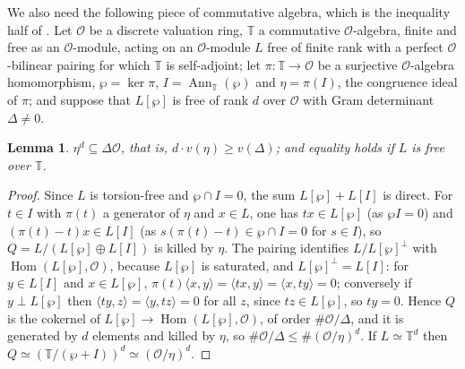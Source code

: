 \documentclass[11pt]{amsart}
\newtheorem{lemma}[theorem]{Lemma}
\theoremstyle{definition}
\newcommand{\T}{\mathbb{T}}
\begin{document}
We also need the following piece of commutative algebra, which is the inequality half of \cite[Lemma 4.17]{DDT}. Let $\mathcal{O}$ be a discrete valuation ring, $\T$ a commutative $\mathcal{O}$-algebra, finite and free as an $\mathcal{O}$-module, acting on an $\mathcal{O}$-module $L$ free of finite rank with a perfect $\mathcal{O}$-bilinear pairing for which $\T$ is self-adjoint; let $\pi\colon\T\to\mathcal{O}$ be a surjective $\mathcal{O}$-algebra homomorphism, $\wp=\ker\pi$, $I=\operatorname{Ann}_\T(\wp)$ and $\eta=\pi(I)$, the congruence ideal of $\pi$; and suppose that $L[\wp]$ is free of rank $d$ over $\mathcal{O}$ with Gram determinant $\Delta\ne0$.

\begin{lemma}\label{lem:ddt417}
$\eta^d\subseteq\Delta\mathcal{O}$, that is, $d\cdot v(\eta)\ge v(\Delta)$; and equality holds if $L$ is free over $\T$.
\end{lemma}
\begin{proof}
Since $L$ is torsion-free and $\wp\cap I=0$, the sum $L[\wp]+L[I]$ is direct. For $t\in I$ with $\pi(t)$ a generator of $\eta$ and $x\in L$, one has $tx\in L[\wp]$ (as $\wp I=0$) and $(\pi(t)-t)x\in L[I]$ (as $s(\pi(t)-t)\in\wp\cap I=0$ for $s\in I$), so $Q=L/(L[\wp]\oplus L[I])$ is killed by $\eta$. The pairing identifies $L/L[\wp]^\perp$ with $\operatorname{Hom}(L[\wp],\mathcal{O})$, because $L[\wp]$ is saturated, and $L[\wp]^\perp=L[I]$: for $y\in L[I]$ and $x\in L[\wp]$, $\pi(t)\langle x,y\rangle=\langle tx,y\rangle=\langle x,ty\rangle=0$; conversely if $y\perp L[\wp]$ then $\langle ty,z\rangle=\langle y,tz\rangle=0$ for all $z$, since $tz\in L[\wp]$, so $ty=0$. Hence $Q$ is the cokernel of $L[\wp]\to\operatorname{Hom}(L[\wp],\mathcal{O})$, of order $\#\mathcal{O}/\Delta$, and it is generated by $d$ elements and killed by $\eta$, so $\#\mathcal{O}/\Delta\le\#(\mathcal{O}/\eta)^d$. If $L\simeq\T^d$ then $Q\simeq(\T/(\wp+I))^d\simeq(\mathcal{O}/\eta)^d$.
\end{proof}
\end{document}

